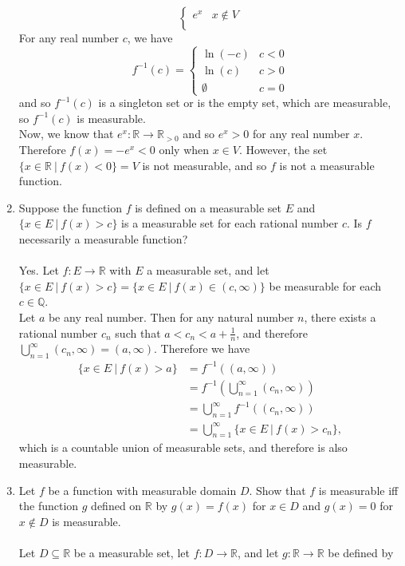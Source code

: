 \begin{enumerate}
\[\begin{cases}
            e^x&x\notin V\\
        \end{cases}    
    \]
    For any real number $c$, we have
    \[
        f^{-1}(c)=
        \begin{cases}
            \ln(-c)& c<0\\
            \ln(c)& c>0\\
            \emptyset& c=0
        \end{cases}
    \]
    and so $f^{-1}(c)$ is a singleton set or is the empty set, which are measurable, so $f^{-1}(c)$ is measurable.\\
    Now, we know that $e^x:\mathbb{R}\to\mathbb{R}_{>0}$ and so $e^x>0$ for any real number $x$.\\
    Therefore $f(x)=-e^x<0$ only when $x\in V$.
    However, the set $\{x\in\mathbb{R}\ |\ f(x)<0\}=V$ is not measurable, and so $f$ is not a measurable function.
    \item Suppose the function $f$ is defined on a measurable set $E$ and $\{x\in E\ |\ f(x)>c\}$ is a measurable set for each rational number $c$. Is $f$ necessarily a measurable function?\\
    \\Yes. Let $f:E\to\mathbb{R}$ with $E$ a measurable set, and let $\{x\in E\ |\ f(x)>c\}=\{x\in E\ |\ f(x)\in(c,\infty)\}$ be measurable for each $c\in\mathbb{Q}$.\\
    Let $a$ be any real number. Then for any natural number $n$, there exists a rational number $c_n$ such that $a<c_n<a+\frac{1}{n}$, and therefore $\bigcup_{n=1}^\infty(c_n,\infty)=(a,\infty)$.
    Therefore we have
    \begin{align*}
        \{x\in E\ |\ f(x)>a\} &= f^{-1}((a,\infty))\\
        &=f^{-1}(\bigcup_{n=1}^\infty(c_n,\infty))\\
        &=\bigcup_{n=1}^\infty f^{-1}((c_n,\infty))\\
        &=\bigcup_{n=1}^\infty \{x\in E\ |\ f(x)>c_n\},
    \end{align*}
    which is a countable union of measurable sets, and therefore is also measurable.
    \item Let $f$ be a function with measurable domain $D$. Show that $f$ is measurable iff the function $g$ defined on $\mathbb{R}$ by $g(x)=f(x)$ for $x\in D$ and $g(x)=0$ for $x\notin D$ is measurable.\\
    \\Let $D\subseteq\mathbb{R}$ be a measurable set, let $f:D\to\mathbb{R}$, and let $g:\mathbb{R}\to\mathbb{R}$ be defined by

\end{enumerate}
